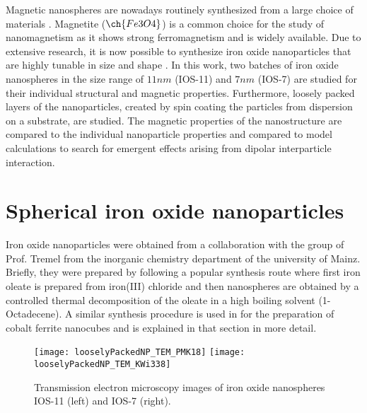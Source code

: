 \documentclass[\main/dresen_thesis.tex]{subfiles}
\begin{document}
  Magnetic nanospheres are nowadays routinely synthesized from a large choice of materials \cite{Gubin_2005_Magne}.
  Magnetite ($\ch{Fe3O4}$) is a common choice for the study of nanomagnetism as it shows strong ferromagnetism and is widely available.
  Due to extensive research, it is now possible to synthesize iron oxide nanoparticles that are highly tunable in size and shape \cite{Wetterskog_2014_Preci}.
  In this work, two batches of iron oxide nanospheres in the size range of $11 \unit{nm}$ (IOS-11) and $7 \unit{nm}$ (IOS-7) are studied for their individual structural and magnetic properties.
  Furthermore, loosely packed layers of the nanoparticles, created by spin coating the particles from dispersion on a substrate, are studied.
  The magnetic properties of the nanostructure are compared to the individual nanoparticle properties and compared to model calculations to search for emergent effects arising from dipolar interparticle interaction.

  \section{Spherical iron oxide nanoparticles}\label{sec:looselyPackedNP:sphericalIronOxideNP}
  Iron oxide nanoparticles were obtained from a collaboration with the group of Prof. Tremel from the inorganic chemistry department of the university of Mainz.
  Briefly, they were prepared by following a popular synthesis route where first iron oleate is prepared from iron(III) chloride and then nanospheres are obtained by a controlled thermal decomposition of the oleate in a high boiling solvent (1-Octadecene).
  A similar synthesis procedure is used in  for the preparation of cobalt ferrite nanocubes and is explained in that section in more detail.

  \begin{figure}[tb]
    \centering
    \texttt{[image: looselyPackedNP\_TEM\_PMK18]}
    \texttt{[image: looselyPackedNP\_TEM\_KWi338]}
    \caption{\label{fig:looselyPackedNP:nanoparticle:tem}Transmission electron microscopy images of iron oxide nanospheres IOS-11 (left) and IOS-7 (right).}
  \end{figure}
\end{document}
